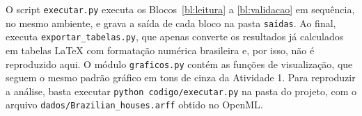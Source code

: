 \documentclass[12pt,a4paper]{article}
\begin{document}
O script \texttt{executar.py} executa os Blocos~\ref{bl:leitura} a \ref{bl:validacao} em sequência, no mesmo ambiente, e grava a saída de cada bloco na pasta \texttt{saidas}. Ao final, executa \texttt{exportar\_tabelas.py}, que apenas converte os resultados já calculados em tabelas \LaTeX{} com formatação numérica brasileira e, por isso, não é reproduzido aqui. O módulo \texttt{graficos.py} contém as funções de visualização, que seguem o mesmo padrão gráfico em tons de cinza da Atividade 1. Para reproduzir a análise, basta executar \texttt{python codigo/executar.py} na pasta do projeto, com o arquivo \texttt{dados/Brazilian\_houses.arff} obtido no OpenML.




\end{document}
